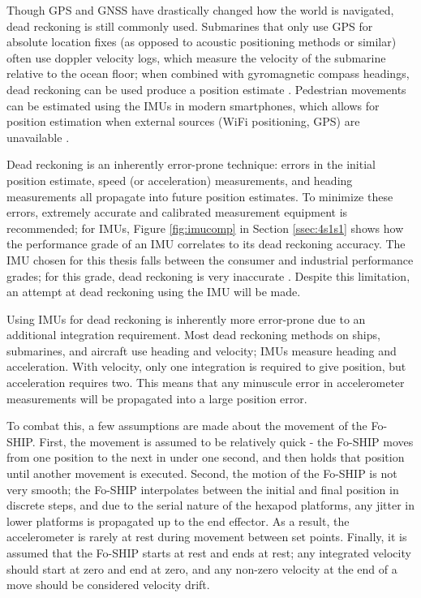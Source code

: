 \documentclass[12pt,a4paper]{report}
\begin{document}
Though GPS and GNSS have drastically changed how the world is navigated, dead reckoning is still commonly used. Submarines that only use GPS for absolute location fixes (as opposed to acoustic positioning methods or similar) often use doppler velocity logs, which measure the velocity of the submarine relative to the ocean floor; when combined with gyromagnetic compass headings, dead reckoning can be used produce a position estimate \cite{surveyurpn}. Pedestrian movements can be estimated using the IMUs in modern smartphones, which allows for position estimation when external sources (WiFi positioning, GPS) are unavailable \cite{sfcomp} \cite{madgstep}. 

Dead reckoning is an inherently error-prone technique: errors in the initial position estimate, speed (or acceleration) measurements, and heading measurements all propagate into future position estimates. To minimize these errors, extremely accurate and calibrated measurement equipment is recommended; for IMUs, Figure \ref{fig:imucomp} in Section \ref{ssec:4s1s1} shows how the performance grade of an IMU correlates to its dead reckoning accuracy. The IMU chosen for this thesis falls between the consumer and industrial performance grades; for this grade, dead reckoning is very inaccurate \cite{imuadvnav}. Despite this limitation, an attempt at dead reckoning using the IMU will be made.

Using IMUs for dead reckoning is inherently more error-prone due to an additional integration requirement. Most dead reckoning methods on ships, submarines, and aircraft use heading and velocity; IMUs measure heading and acceleration. With velocity, only one integration is required to give position, but acceleration requires two. This means that any minuscule error in accelerometer measurements will be propagated into a large position error.

To combat this, a few assumptions are made about the movement of the Fo-SHIP. First, the movement is assumed to be relatively quick - the Fo-SHIP moves from one position to the next in under one second, and then holds that position until another movement is executed. Second, the motion of the Fo-SHIP is not very smooth; the Fo-SHIP interpolates between the initial and final position in discrete steps, and due to the serial nature of the hexapod platforms, any jitter in lower platforms is propagated up to the end effector. As a result, the accelerometer is rarely at rest during movement between set points. Finally, it is assumed that the Fo-SHIP starts at rest and ends at rest; any integrated velocity should start at zero and end at zero, and any non-zero velocity at the end of a move should be considered velocity drift.
\end{document}
